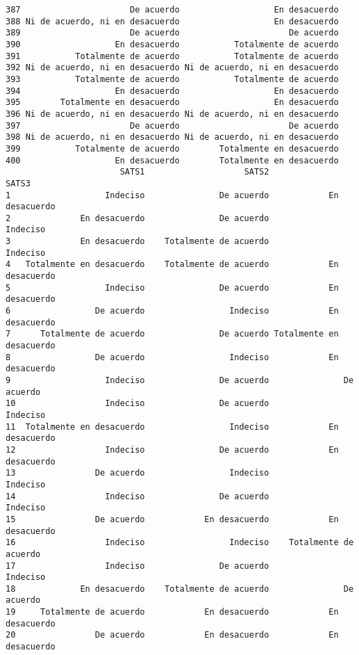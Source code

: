 \documentclass[
  letterpaper,
  DIV=11,
  numbers=noendperiod]{scrartcl}
\begin{document}
\begin{verbatim}
387                      De acuerdo                   En desacuerdo
388 Ni de acuerdo, ni en desacuerdo                   En desacuerdo
389                      De acuerdo                      De acuerdo
390                   En desacuerdo           Totalmente de acuerdo
391           Totalmente de acuerdo           Totalmente de acuerdo
392 Ni de acuerdo, ni en desacuerdo Ni de acuerdo, ni en desacuerdo
393           Totalmente de acuerdo           Totalmente de acuerdo
394                   En desacuerdo                   En desacuerdo
395        Totalmente en desacuerdo                   En desacuerdo
396 Ni de acuerdo, ni en desacuerdo Ni de acuerdo, ni en desacuerdo
397                      De acuerdo                      De acuerdo
398 Ni de acuerdo, ni en desacuerdo Ni de acuerdo, ni en desacuerdo
399           Totalmente de acuerdo        Totalmente en desacuerdo
400                   En desacuerdo        Totalmente en desacuerdo
                       SATS1                    SATS2                    SATS3
1                   Indeciso               De acuerdo            En desacuerdo
2              En desacuerdo               De acuerdo                 Indeciso
3              En desacuerdo    Totalmente de acuerdo                 Indeciso
4   Totalmente en desacuerdo    Totalmente de acuerdo            En desacuerdo
5                   Indeciso               De acuerdo            En desacuerdo
6                 De acuerdo                 Indeciso            En desacuerdo
7      Totalmente de acuerdo               De acuerdo Totalmente en desacuerdo
8                 De acuerdo                 Indeciso            En desacuerdo
9                   Indeciso               De acuerdo               De acuerdo
10                  Indeciso               De acuerdo                 Indeciso
11  Totalmente en desacuerdo                 Indeciso            En desacuerdo
12                  Indeciso               De acuerdo            En desacuerdo
13                De acuerdo                 Indeciso                 Indeciso
14                  Indeciso               De acuerdo                 Indeciso
15                De acuerdo            En desacuerdo            En desacuerdo
16                  Indeciso                 Indeciso    Totalmente de acuerdo
17                  Indeciso               De acuerdo                 Indeciso
18             En desacuerdo    Totalmente de acuerdo               De acuerdo
19     Totalmente de acuerdo            En desacuerdo            En desacuerdo
20                De acuerdo            En desacuerdo            En desacuerdo

\end{verbatim}
\end{document}
